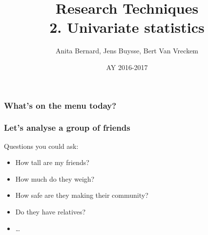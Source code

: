 \documentclass{beamer}
\title[Univariate statistics]{Research Techniques\\2. Univariate statistics}
\author{Anita Bernard, Jens Buysse, Bert {Van Vreckem}}
\date{AY 2016-2017}
\begin{document}

\HoGentLogo

\titleframe


\begin{frame}
  \frametitle{What's on the menu today?}

  \tableofcontents
\end{frame}

\begin{frame}
  \frametitle{Let's analyse a group of friends}

  Questions you could ask:

  \begin{itemize}
    \item How tall are my friends?
    \item How much do they weigh?
    \item How safe are they making their community?
    \item Do they have relatives?
    \item \ldots
  \end{itemize}
\end{frame}
\end{document}
